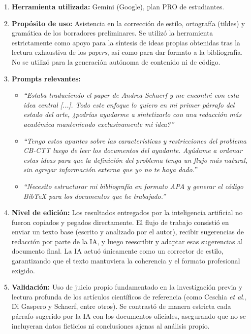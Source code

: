 \documentclass[letter, 10pt]{article}
\begin{document}
\begin{enumerate}
    \item \textbf{Herramienta utilizada:} Gemini (Google), plan PRO de estudiantes.
    
    \item \textbf{Propósito de uso:} Asistencia en la corrección de estilo, ortografía (tildes) y gramática de los borradores preliminares. Se utilizó la herramienta estrictamente como apoyo para la síntesis de ideas propias obtenidas tras la lectura exhaustiva de los \textit{papers}, así como para dar formato a la bibliografía. No se utilizó para la generación autónoma de contenido ni de código.
    
    \item \textbf{Prompts relevantes:} 
    \begin{itemize}
        \item \textit{``Estaba traduciendo el paper de Andrea Schaerf y me encontré con esta idea central [...]. Todo este enfoque lo quiero en mi primer párrafo del estado del arte, ¿podrías ayudarme a sintetizarlo con una redacción más académica manteniendo exclusivamente mi idea?''}
        \item \textit{``Tengo estos apuntes sobre las características y restricciones del problema CB-CTT luego de leer los documentos del ayudante. Ayúdame a ordenar estas ideas para que la definición del problema tenga un flujo más natural, sin agregar información externa que yo no te haya dado.''}
        \item \textit{``Necesito estructurar mi bibliografía en formato APA y generar el código BibTeX para los documentos que he trabajado.''}
    \end{itemize}
    
    \item \textbf{Nivel de edición:} Los resultados entregados por la inteligencia artificial no fueron copiados y pegados directamente. El flujo de trabajo consistió en enviar un texto base (escrito y analizado por el autor), recibir sugerencias de redacción por parte de la IA, y luego reescribir y adaptar esas sugerencias al documento final. La IA actuó únicamente como un corrector de estilo, garantizando que el texto mantuviera la coherencia y el formato profesional exigido.
    
    \item \textbf{Validación:} Uso de juicio propio fundamentado en la investigación previa y lectura profunda de los artículos científicos de referencia (como Ceschia \textit{et al.}, Di Gaspero y Schaerf, entre otros). Se contrastó de manera estricta cada párrafo sugerido por la IA con los documentos oficiales, asegurando que no se incluyeran datos ficticios ni conclusiones ajenas al análisis propio.
\end{enumerate}





\end{document}
